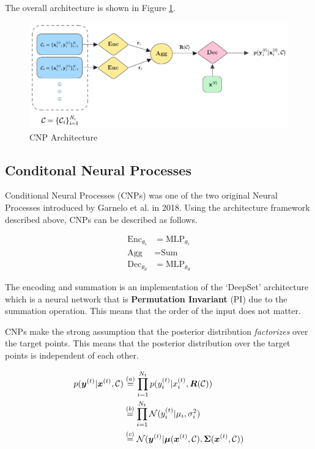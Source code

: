 \documentclass[../../main.tex]{subfiles}
\begin{document}
The overall architecture is shown in Figure \ref{fig:cnp-architecture}.

\begin{figure}[H]
	\centering
	\includegraphics[height=0.3\textwidth]{./cnp.png}
	\caption{CNP Architecture}
	\label{fig:cnp-architecture}
\end{figure}




\subsection{Conditonal Neural Processes}

Conditional Neural Processes (CNPs) \cite{garnelo2018conditional} was one of the two original Neural Processes introduced by Garnelo et al. in 2018. Using the architecture framework described above, CNPs can be described as follows.

\begin{align*}
    \text{Enc}_{\theta_e} &= \text{MLP}_{\theta_e} \\
    \text{Agg} &= \text{Sum} \\
    \text{Dec}_{\theta_d}  &= \text{MLP}_{\theta_d} 
\end{align*}

The encoding and summation is an implementation of the `DeepSet' architecture \cite{zaheer2018deep} which is a neural network that is \textbf{Permutation Invariant} (PI) due to the summation operation. This means that the order of the input does not matter. 


CNPs make the strong assumption that the posterior distribution \emph{factorizes} over the target points. This means that the posterior distribution over the target points is independent of each other. 

\begin{align}
    p(\bm{y}^{(t)} | \bm{x}^{(t)}, \mathcal{C}) &\stackrel{(a)}{=} \prod_{i=1}^{N_t} p({y}_i^{(t)} | {x}_i^{(t)}, \bm{R}(\mathcal{C})) \\ &\stackrel{(b)}{=}
    \prod_{i=1}^{N_t} \mathcal{N}({y}_i^{(t)} | \mu_i, \sigma_i^2) \\&\stackrel{(c)}{=} \mathcal{N}(\bm{y}^{(t)} | \bm{\mu}(\bm{x}^{(t)}, \mathcal{C}), \bm{\Sigma}(\bm{x}^{(t)}, \mathcal{C}))
\end{align}
\end{document}
